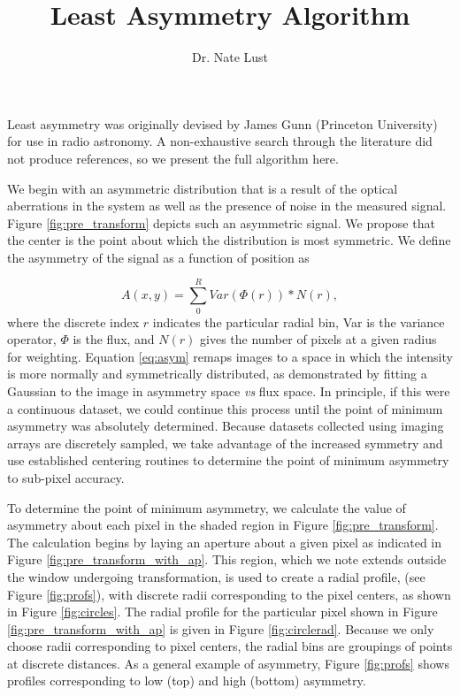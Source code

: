 \documentclass{article}
\begin{document}
\title{\vspace{-3.5cm}Least Asymmetry Algorithm}
\author{Dr. Nate Lust}
\maketitle
Least asymmetry was originally devised by James Gunn (Princeton
University) for use in radio astronomy. A non-exhaustive search through the
literature did not produce references, so we present the full
algorithm here.

We begin with an asymmetric distribution that is a result of the
optical aberrations in the system as well as the presence of noise in
the measured signal. Figure \ref{fig:pre_transform} depicts such an
asymmetric signal. We propose that the center is the point about which
the distribution is most symmetric. We define the asymmetry of the
signal as a function of position as

\begin{equation}
  \label{eq:asym}
  A(x,y) = \sum\limits_0^{R}Var(\Phi(r))*N(r),
\end{equation}
\noindent
where the discrete index $r$ indicates the particular radial bin, Var
is the variance operator, $\Phi$ is the flux, and $N(r)$ gives the
number of pixels at a given radius for weighting.  Equation
\ref{eq:asym} remaps images to a space in which the intensity is more
normally and symmetrically distributed, as demonstrated by fitting a
Gaussian to the image in asymmetry space {\em vs} flux space. In
principle, if this were a continuous dataset, we could continue this
process until the point of minimum asymmetry was absolutely
determined. Because datasets collected using imaging arrays are
discretely sampled, we take advantage of the increased symmetry and
use established centering routines to determine the point of minimum
asymmetry to sub-pixel accuracy.

To determine the point of minimum asymmetry, we calculate the
value of asymmetry about each pixel in the shaded region in Figure
\ref{fig:pre_transform}. The calculation begins by laying an aperture
about a given pixel as indicated in Figure
\ref{fig:pre_transform_with_ap}. This region, which we note extends
outside the window undergoing transformation, is used to create a
radial profile, (see Figure \ref{fig:profs}), with discrete radii
corresponding to the pixel centers, as shown in Figure
\ref{fig:circles}. The radial profile for the particular pixel shown
in Figure \ref{fig:pre_transform_with_ap} is given in Figure
\ref{fig:circlerad}. Because we only choose radii corresponding to
pixel centers, the radial bins are groupings of points at discrete
distances. As a general example of asymmetry, Figure \ref{fig:profs}
shows profiles corresponding to low (top) and high (bottom) asymmetry.
\end{document}
